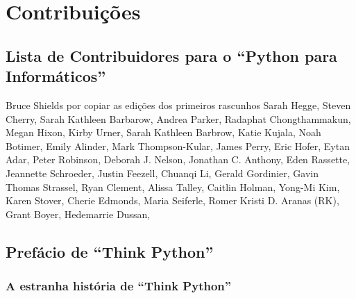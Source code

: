 
\chapter{Contribuições}
\section*{Lista de Contribuidores para o ``Python para Informáticos''}

Bruce Shields por copiar as edições dos primeiros rascunhos
Sarah Hegge,
Steven Cherry,
Sarah Kathleen Barbarow,
Andrea Parker,
Radaphat Chongthammakun,
Megan Hixon,
Kirby Urner,
Sarah Kathleen Barbrow,
Katie Kujala,
Noah Botimer,
Emily Alinder,
Mark Thompson-Kular,
James Perry,
Eric Hofer,
Eytan Adar,
Peter Robinson,
Deborah J. Nelson,
Jonathan C. Anthony,
Eden Rassette,
Jeannette Schroeder,
Justin Feezell,
Chuanqi Li,
Gerald Gordinier,
Gavin Thomas Strassel,
Ryan Clement,
Alissa Talley,
Caitlin Holman,
Yong-Mi Kim,
Karen Stover,
Cherie Edmonds,
Maria Seiferle,
Romer Kristi D. Aranas (RK),
Grant Boyer,
Hedemarrie Dussan,


\section*{Prefácio de ``Think Python''}


\subsection*{A estranha história de ``Think Python''}

